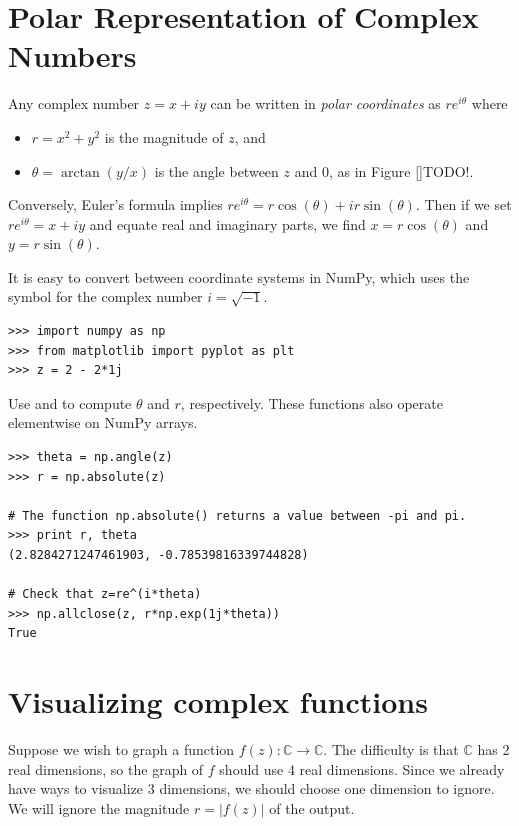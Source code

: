 \label{Lab:complex_intro}


\section*{Polar Representation of Complex Numbers}

Any complex number $z = x+iy$ can be written in \emph{polar coordinates} as $re^{i\theta}$ where
\begin{itemize}
\item $r=x^2+y^2$ is the magnitude of $z$, and
\item $\theta = \arctan(y/x)$ is the angle between $z$ and 0, as in Figure \ref{}TODO!.
\end{itemize}
Conversely, Euler's formula implies $re^{i\theta} = r\cos(\theta) + ir\sin(\theta)$. Then if we set $re^{i\theta}=x+iy$ and equate real and imaginary parts, we find $x=r\cos(\theta)$ and $y=r\sin(\theta)$.

It is easy to convert between coordinate systems in NumPy, which uses the symbol  for the complex number $i=\sqrt{-1}$.
\begin{lstlisting}
>>> import numpy as np
>>> from matplotlib import pyplot as plt
>>> z = 2 - 2*1j
\end{lstlisting}
Use  and  to compute $\theta$ and $r$, respectively.
These functions also operate elementwise on NumPy arrays.
\begin{lstlisting}
>>> theta = np.angle(z)
>>> r = np.absolute(z)

# The function np.absolute() returns a value between -pi and pi.
>>> print r, theta
(2.8284271247461903, -0.78539816339744828)

# Check that z=re^(i*theta)
>>> np.allclose(z, r*np.exp(1j*theta))
True
\end{lstlisting}

\section*{Visualizing complex functions}
Suppose we wish to graph a function $f(z): \mathbb{C} \rightarrow \mathbb{C}$. 
The difficulty is that $\mathbb{C}$ has 2 real dimensions, so the graph of $f$ should use 4 real dimensions.
 Since we already have ways to visualize 3 dimensions, we should choose one dimension to ignore. 
 We will ignore the magnitude $r = |f(z)|$ of the output.


